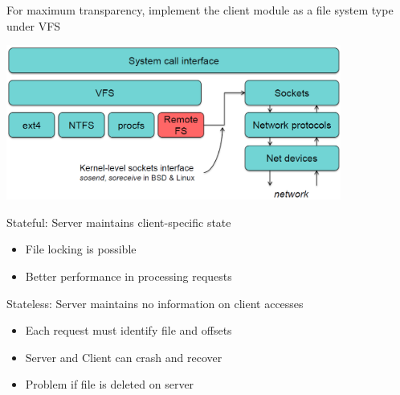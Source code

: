 \begin{slide}

	
	For maximum transparency, implement the client module as a file system type under VFS
	\medskip
	
	\includegraphics[width=110mm]{accessing-remote-files.png} 

\end{slide}

\begin{slide}

	
	Stateful: Server maintains client-specific state
	\begin{itemize}
		\item File locking is possible
		\item Better performance in processing requests
	\end{itemize}
	\bigskip
	
	Stateless: Server maintains no information on client accesses
	\begin{itemize}
		\item Each request must identify file and offsets
		\item Server and Client can crash and recover		
		\item Problem if file is deleted on server
	\end{itemize}
	
\end{slide}

